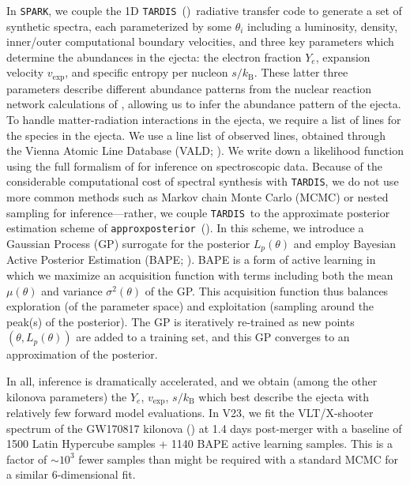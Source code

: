 \documentclass[twocolumn, twocolappendix]{aastex63}
\def\SPARK{\texttt{SPARK}}
\def\TARDIS{\texttt{TARDIS}}
\def\approxposterior{\texttt{approxposterior}}
\begin{document}
In \SPARK, we couple the 1D \TARDIS~(\citealt{kerzendorf14})~radiative transfer code to generate a set of synthetic spectra, each parameterized by some $\theta_i$ including a luminosity, density, inner/outer computational boundary velocities, and three key parameters which determine the abundances in the ejecta: the electron fraction $Y_e$, expansion velocity $v_{\mathrm{exp}}$, and specific entropy per nucleon $s / k_{\mathrm{B}}$. These latter three parameters describe different abundance patterns from the nuclear reaction network calculations of \cite{wanajo18}, allowing us to infer the abundance pattern of the ejecta. To handle matter-radiation interactions in the ejecta, we require a list of lines for the species in the ejecta. We use a line list of observed lines, obtained through the Vienna Atomic Line Database (VALD; \citealt{ryabchikova15, pakhomov19}). We write down a likelihood function using the full formalism of \cite{czekala15} for inference on spectroscopic data. Because of the considerable computational cost of spectral synthesis with \TARDIS, we do not use more common methods such as Markov chain Monte Carlo (MCMC) or nested sampling for inference---rather, we couple \TARDIS~to the approximate posterior estimation scheme of \approxposterior~(\citealt{fleming18,fleming20}). In this scheme, we introduce a Gaussian Process (GP) surrogate for the posterior $L_p (\theta)$ and employ Bayesian Active Posterior Estimation (BAPE; \citealt{kandasamy17}). BAPE is a form of active learning in which we maximize an acquisition function with terms including both the mean $\mu(\theta)$ and variance $\sigma^2(\theta)$ of the GP. This acquisition function thus balances exploration (of the parameter space) and exploitation (sampling around the peak(s) of the posterior). The GP is iteratively re-trained as new points $(\theta, L_p(\theta))$ are added to a training set, and this GP converges to an approximation of the posterior. 

In all, inference is dramatically accelerated, and we obtain (among the other kilonova parameters) the $Y_e$, $v_{\mathrm{exp}}$, $s / k_{\mathrm{B}}$ which best describe the ejecta with relatively few forward model evaluations. In V23, we fit the VLT/X-shooter spectrum of the GW170817 kilonova (\citealt{pian17, smartt17}) at 1.4 days post-merger with a baseline of 1500 Latin Hypercube samples + 1140 BAPE active learning samples. This is a factor of $\sim 10^3$ fewer samples than might be required with a standard MCMC for a similar 6-dimensional fit.
\end{document}

